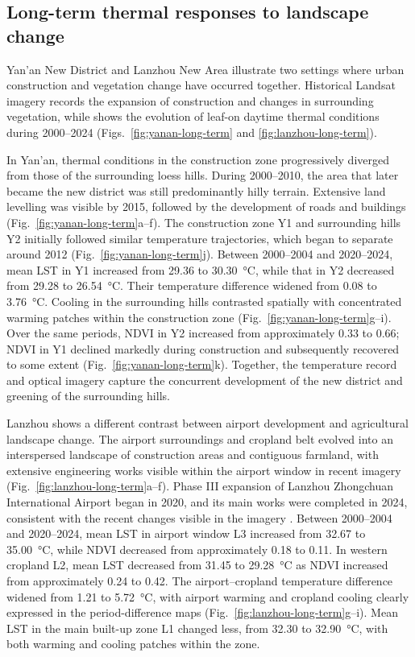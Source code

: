 \subsection{Long-term thermal responses to landscape change}
\label{sec:long-term-cases}

Yan'an New District and Lanzhou New Area illustrate two settings where urban construction and vegetation change have occurred together. Historical Landsat imagery records the expansion of construction and changes in surrounding vegetation, while \chinatherm{} shows the evolution of leaf-on daytime thermal conditions during 2000--2024 (Figs.~\ref*{fig:yanan-long-term} and \ref*{fig:lanzhou-long-term}).

In Yan'an, thermal conditions in the construction zone progressively diverged from those of the surrounding loess hills. During 2000--2010, the area that later became the new district was still predominantly hilly terrain. Extensive land levelling was visible by 2015, followed by the development of roads and buildings (Fig.~\ref*{fig:yanan-long-term}a--f). The construction zone Y1 and surrounding hills Y2 initially followed similar temperature trajectories, which began to separate around 2012 (Fig.~\ref*{fig:yanan-long-term}j). Between 2000--2004 and 2020--2024, mean LST in Y1 increased from 29.36 to 30.30~°C, while that in Y2 decreased from 29.28 to 26.54~°C. Their temperature difference widened from 0.08 to 3.76~°C. Cooling in the surrounding hills contrasted spatially with concentrated warming patches within the construction zone (Fig.~\ref*{fig:yanan-long-term}g--i). Over the same periods, NDVI in Y2 increased from approximately 0.33 to 0.66; NDVI in Y1 declined markedly during construction and subsequently recovered to some extent (Fig.~\ref*{fig:yanan-long-term}k). Together, the temperature record and optical imagery capture the concurrent development of the new district and greening of the surrounding hills.

Lanzhou shows a different contrast between airport development and agricultural landscape change. The airport surroundings and cropland belt evolved into an interspersed landscape of construction areas and contiguous farmland, with extensive engineering works visible within the airport window in recent imagery (Fig.~\ref*{fig:lanzhou-long-term}a--f). Phase III expansion of Lanzhou Zhongchuan International Airport began in 2020, and its main works were completed in 2024, consistent with the recent changes visible in the imagery \parencite{lanzhou2024airport}. Between 2000--2004 and 2020--2024, mean LST in airport window L3 increased from 32.67 to 35.00~°C, while NDVI decreased from approximately 0.18 to 0.11. In western cropland L2, mean LST decreased from 31.45 to 29.28~°C as NDVI increased from approximately 0.24 to 0.42. The airport--cropland temperature difference widened from 1.21 to 5.72~°C, with airport warming and cropland cooling clearly expressed in the period-difference maps (Fig.~\ref*{fig:lanzhou-long-term}g--i). Mean LST in the main built-up zone L1 changed less, from 32.30 to 32.90~°C, with both warming and cooling patches within the zone.

